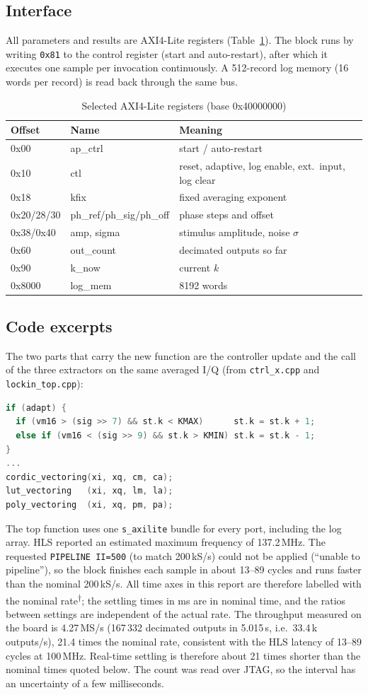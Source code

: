 \documentclass[journal]{IEEEtran}
\newcommand{\nom}{\textsuperscript{$\dagger$}}
\begin{document}
\subsection{Interface}
All parameters and results are AXI4-Lite registers (Table~\ref{tab:regs}). The block runs by writing \texttt{0x81} to the control register (start and auto-restart), after which it executes one sample per invocation continuously. A 512-record log memory (16 words per record) is read back through the same bus.
\begin{table}[t]\centering\caption{Selected AXI4-Lite registers (base 0x40000000)}\label{tab:regs}
\begin{tabular}{@{}llp{1.55in}@{}}\toprule
Offset & Name & Meaning\\\midrule
0x00 & ap\_ctrl & start / auto-restart\\
0x10 & ctl & reset, adaptive, log enable, ext.\ input, log clear\\
0x18 & kfix & fixed averaging exponent\\
0x20/28/30 & ph\_ref/ph\_sig/ph\_off & phase steps and offset\\
0x38/0x40 & amp, sigma & stimulus amplitude, noise $\sigma$\\
0x60 & out\_count & decimated outputs so far\\
0x90 & k\_now & current $k$\\
0x8000 & log\_mem & 8192 words\\\bottomrule
\end{tabular}\end{table}

\subsection{Code excerpts}
The two parts that carry the new function are the controller update and the call of the three extractors on the same averaged I/Q (from \texttt{ctrl\_x.cpp} and \texttt{lockin\_top.cpp}):
\begin{lstlisting}[language=C++]
if (adapt) {
  if (vm16 > (sig >> 7) && st.k < KMAX)      st.k = st.k + 1;
  else if (vm16 < (sig >> 9) && st.k > KMIN) st.k = st.k - 1;
}
...
cordic_vectoring(xi, xq, cm, ca);
lut_vectoring   (xi, xq, lm, la);
poly_vectoring  (xi, xq, pm, pa);
\end{lstlisting}
The top function uses one \texttt{s\_axilite} bundle for every port, including the log array. HLS reported an estimated maximum frequency of 137.2\,MHz. The requested \texttt{PIPELINE II=500} (to match 200\,kS/s) could not be applied (``unable to pipeline''), so the block finishes each sample in about 13--89 cycles and runs faster than the nominal 200\,kS/s. All time axes in this report are therefore labelled with the nominal rate\nom{}; the settling times in ms are in nominal time, and the ratios between settings are independent of the actual rate. The throughput measured on the board is 4.27\,MS/s (167\,332 decimated outputs in 5.015\,s, i.e.\ 33.4\,k outputs/s), 21.4 times the nominal rate, consistent with the HLS latency of 13--89 cycles at 100\,MHz. Real-time settling is therefore about 21 times shorter than the nominal times quoted below. The count was read over JTAG, so the interval has an uncertainty of a few milliseconds.
\end{document}

